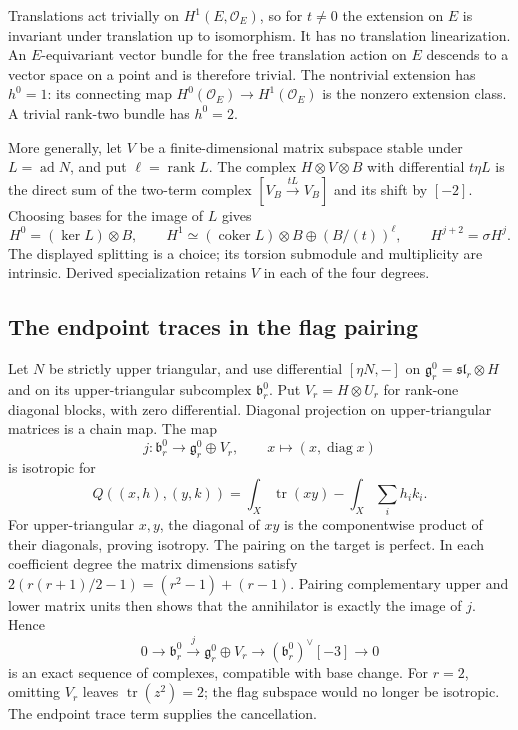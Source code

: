 Translations act trivially on $H^1(E,\mathcal O_E)$,
so for $t\ne0$ the extension on $E$ is invariant under
translation up to isomorphism. It has no translation
linearization. An $E$-equivariant vector bundle for the
free translation action on $E$ descends to a vector space
on a point and is therefore trivial. The nontrivial
extension has $h^0=1$: its connecting map
$H^0(\mathcal O_E)\to H^1(\mathcal O_E)$ is the nonzero
extension class. A trivial rank-two bundle has $h^0=2$.

More generally, let $V$ be a finite-dimensional matrix subspace
stable under $L=\operatorname{ad}N$, and put $\ell=\operatorname{rank}L$.
The complex $H\otimes V\otimes B$ with differential $t\eta L$
is the direct sum of the two-term complex $[V_B\xrightarrow{tL}V_B]$
and its shift by $[-2]$. Choosing bases for the image of $L$
gives
\[
 H^0=(\ker L)\otimes B,\qquad
 H^1\simeq(\operatorname{coker}L)\otimes B\oplus(B/(t))^\ell,
 \qquad H^{j+2}=\sigma H^j.
\]
The displayed splitting is a choice; its torsion submodule
and multiplicity are intrinsic. Derived specialization retains
$V$ in each of the four degrees.

\subsection{The endpoint traces in the flag pairing}

Let $N$ be strictly upper triangular, and use differential
$[\eta N,-]$ on
$\mathfrak g_r^0=\mathfrak{sl}_r\otimes H$ and on its
upper-triangular subcomplex $\mathfrak b_r^0$. Put
$V_r=H\otimes U_r$ for rank-one diagonal blocks, with zero
differential. Diagonal projection on upper-triangular matrices
is a chain map. The map
\[
 j:\mathfrak b_r^0\longrightarrow\mathfrak g_r^0\oplus V_r,
 \qquad x\longmapsto(x,\operatorname{diag}x)
\]
is isotropic for
\[
 Q((x,h),(y,k))=\int_X\operatorname{tr}(xy)-\int_X\sum_i h_ik_i.
\]
For upper-triangular $x,y$, the diagonal of $xy$ is the
componentwise product of their diagonals, proving isotropy.
The pairing on the target is perfect. In each coefficient
degree the matrix dimensions satisfy
$2(r(r+1)/2-1)=(r^2-1)+(r-1)$.
Pairing complementary upper and lower
matrix units then shows that the annihilator is exactly the
image of $j$. Hence
\begin{equation}\label{cycompact:eq:flag-pairing}
 0\longrightarrow\mathfrak b_r^0
 \xrightarrow{j}\mathfrak g_r^0\oplus V_r
 \longrightarrow(\mathfrak b_r^0)^\vee[-3]
 \longrightarrow0
\end{equation}
is an exact sequence of complexes, compatible with base change.
For $r=2$, omitting $V_r$ leaves
$\operatorname{tr}(z^2)=2$; the flag subspace would no longer
be isotropic. The endpoint trace term supplies the cancellation.

